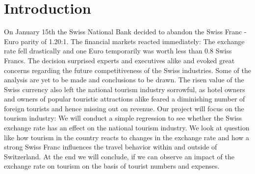 \documentclass[12pt,a4paper,bibliography=totocnumbered,listof=totocnumbered]{scrartcl}
\begin{document}

\section{Introduction}



On January 15th the Swiss National Bank decided to abandon the Swiss Franc - Euro parity of 1.20:1. The financial markets reacted immediately: The exchange rate fell drastically and one Euro temporarily was worth less than 0.8 Swiss Francs. The decision surprised experts and executives alike and evoked great concerns regarding the future competitiveness of the Swiss industries. Some of the analysis are yet to be made and conclusions to be drawn. The risen value of the Swiss currency also left the national tourism industry sorrowful, as hotel owners and owners of popular touristic attractions alike feared a diminishing number of foreign tourists and hence missing out on revenue. Our project will focus on the tourism industry: We will conduct a simple regression to see whether the Swiss exchange rate has an effect on the national tourism industry. We look at question like how tourism in the country reacts to changes in the exchange rate and how a strong Swiss Franc influences the travel behavior within and outside of Switzerland. At the end we will conclude, if we can observe an impact of the exchange rate on tourism on the basis of tourist numbers and expenses. 
\end{document}
